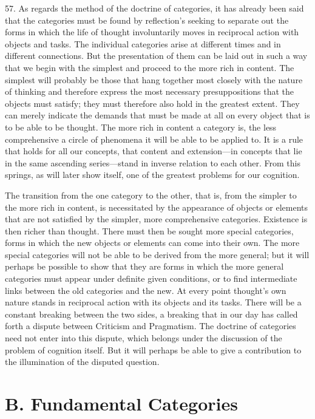 \documentclass[12pt,a4paper]{book}
\newcommand{\opage}[1]{\marginnote{\footnotesize\textit{[#1]}}}
\begin{document}
57. As regards the method of the doctrine of categories, it has already been
said that the categories must be found by reflection's seeking to separate
out the forms in which the life of thought involuntarily moves in reciprocal
action with objects and tasks. The individual categories arise at different
times and in different connections. But the presentation of them can be laid
out in such a way that we begin with the simplest and proceed to the more
rich in content. The simplest will probably be those that hang together most
closely with the nature of thinking and therefore express the most necessary
presuppositions that the objects \opage{154}must satisfy; they must therefore also hold
in the greatest extent. They can merely indicate the demands that must be
made at all on every object that is to be able to be thought. The more rich
in content a category is, the less comprehensive a circle of phenomena it
will be able to be applied to. It is a rule that holds for all our concepts,
that content and extension---in concepts that lie in the same ascending
series---stand in inverse relation to each other. From this springs, as will
later show itself, one of the greatest problems for our cognition.

The transition from the one category to the other, that is, from the simpler
to the more rich in content, is necessitated by the appearance of objects or
elements that are not satisfied by the simpler, more comprehensive
categories. Existence is then richer than thought. There must then be sought
more special categories, forms in which the new objects or elements can come
into their own. The more special categories will not be able to be derived
from the more general; but it will perhaps be possible to show that they are
forms in which the more general categories must appear under definite given
conditions, or to find intermediate links between the old categories and the
new. At every point thought's own nature stands in reciprocal action with its
objects and its tasks. There will be a constant breaking between the two
sides, a breaking that in our day has called forth a dispute between
Criticism and Pragmatism. The doctrine of categories need not enter into this
dispute, which belongs under the discussion of the problem of cognition
itself. But it will perhaps be able to give a contribution to the
illumination of the disputed question.

\section*{B. Fundamental Categories}
\label{sec:fundamentale-kategorier}
\end{document}
